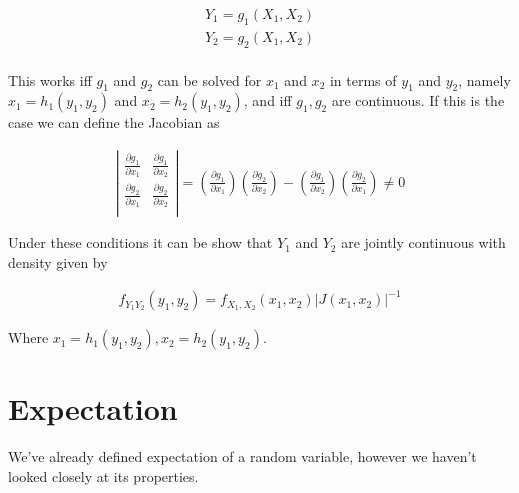     \begin{equation*}
        \begin{aligned}
            Y_1 = g_1(X_1, X_2)\\
            Y_2 = g_2(X_1, X_2)\\
        \end{aligned}
    \end{equation*}

    This works iff $g_1$ and $g_2$ can be solved for $x_1$ and $x_2$ in terms of $y_1$ and $y_2$, namely $x_1 = h_1(y_1,
    y_2)$ and $x_2 = h_2(y_1, y_2)$, and iff $g_1, g_2$ are continuous. If this is the case we can define the Jacobian
    as

    \begin{equation*}
        \begin{aligned}
            \left|
            \begin{array}{cc}
                \frac{\partial g_1}{\partial x_1} & 
                \frac{\partial g_1}{\partial x_2}\\
                \frac{\partial g_2}{\partial x_1} & 
                \frac{\partial g_2}{\partial x_2}\\
            \end{array}
            \right| =
            \left( \frac{\partial g_1}{\partial x_1} \right)
            \left( \frac{\partial g_2}{\partial x_2} \right)
            -
            \left( \frac{\partial g_1}{\partial x_2} \right)
            \left( \frac{\partial g_2}{\partial x_1} \right)
            \neq 0
        \end{aligned}
    \end{equation*}

    Under these conditions it can be show that $Y_1$ and $Y_2$ are jointly continuous with density given by

    \begin{equation*}
        \begin{aligned}
            f_{Y_1Y_2}\left( y_1, y_2 \right) = f_{X_1,X_2}(x_1, x_2) {\left| J(x_1, x_2) \right|}^{-1}
        \end{aligned}
    \end{equation*}

    Where $x_1 = h_1 (y_1 , y_2 ), x_2 = h_2 (y_1 , y_2 )$.

\section{Expectation}
We've already defined expectation of a random variable, however we haven't looked closely at its properties.

